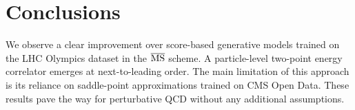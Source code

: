 \section{Conclusions}\label{sec:conclusions}

We observe a clear improvement over score-based generative models
trained on the LHC Olympics dataset in the $\overline{\rm MS}$ scheme. A
particle-level two-point energy correlator emerges at next-to-leading
order. The main limitation of this approach is its reliance on
saddle-point approximations trained on CMS Open Data. These results pave
the way for perturbative QCD without any additional assumptions.

